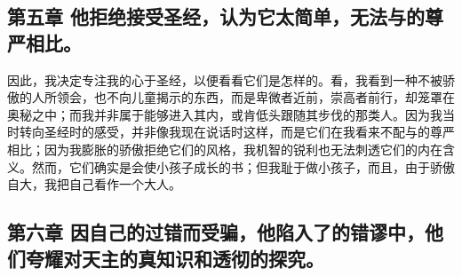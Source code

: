 
\subsection{第五章 他拒绝接受圣经，认为它太简单，无法与的尊严相比。}

因此，我决定专注我的心于圣经，以便看看它们是怎样的。看，我看到一种不被骄傲的人所领会，也不向儿童揭示的东西，而是卑微者近前，崇高者前行，却笼罩在奥秘之中；而我并非属于能够进入其内，或肯低头跟随其步伐的那类人。因为我当时转向圣经时的感受，并非像我现在说话时这样，而是它们在我看来不配与的尊严相比；因为我膨胀的骄傲拒绝它们的风格，我机智的锐利也无法刺透它们的内在含义。然而，它们确实是会使小孩子成长的书；但我耻于做小孩子，而且，由于骄傲自大，我把自己看作一个大人。\par


\subsection{第六章 因自己的过错而受骗，他陷入了的错谬中，他们夸耀对天主的真知识和透彻的探究。}

